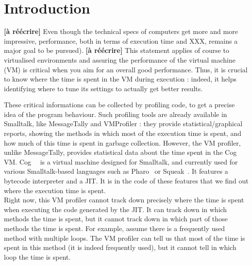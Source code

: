 \documentclass[10pt,preprint]{sigplanconf}
\newcommand{\ct}{\lstinline[backgroundcolor=\color{white},basicstyle=\footnotesize\ttfamily]}
\begin{document}

\section{Introduction}

%
%
%
%
%
%



\textbf{[\`a r\'e\'ecrire]} Even though the technical specs of computers get more and more impressive, performance, both in terms of execution time and XXX, remains a major goal to be pursued). \textbf{[\`a r\'e\'ecrire]}
This statement applies of course to virtualised environments and assuring the performance of the virtual machine (VM) is critical when you aim for an overall good performance. 
Thus, it is crucial to know where the time is spent in the VM during execution : indeed, it helps identifying where to tune its settings to actually get better results.

These critical informations can be collected by profiling code, to get a precise idea of the program behaviour. 
Such profiling tools are already available in Smalltalk, like MessageTally and VMProfiler : they provide statistical/graphical reports, showing the methods in which most of the execution time is spent, and how much of this time is spent in garbage collection. However, the VM profiler, unlike MessageTally, provides statistical data about the time spent in the Cog VM. Cog~\cite{Mira08a}~ is a virtual machine designed for Smalltalk, and currently used for various Smalltalk-based languages such as Pharo~\cite{Blac09a} or Squeak~\cite{Blac07a}. It features a bytecode interpreter and a JIT. It is in the code of these features that we find out where the execution time is spent.\\

Right now, this VM profiler cannot track down precisely where the time is spent when executing the code generated by the JIT. It can track down in which methods the time is spent, but it cannot track down in which part of those methods the time is spent. For example, assume there is a frequently used method with multiple loops. The VM profiler can tell us that most of the time is spent in this method (it is indeed frequently used), but it cannot tell in which loop the time is spent.
\end{document}
